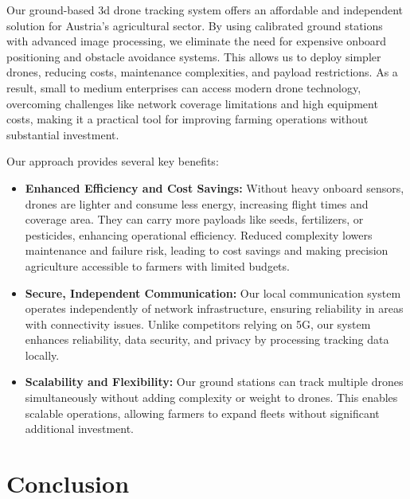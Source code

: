 Our ground-based \acrshort{3d} drone tracking system offers an affordable and independent solution for Austria's agricultural sector. By using calibrated ground stations with advanced image processing, we eliminate the need for expensive onboard positioning and obstacle avoidance systems. This allows us to deploy simpler drones, reducing costs, maintenance complexities, and payload restrictions. As a result, small to medium enterprises can access modern drone technology, overcoming challenges like network coverage limitations and high equipment costs, making it a practical tool for improving farming operations without substantial investment.

Our approach provides several key benefits:

\begin{itemize} 
	\item \textbf{Enhanced Efficiency and Cost Savings:} Without heavy onboard sensors, drones are lighter and consume less energy, increasing flight times and coverage area. They can carry more payloads like seeds, fertilizers, or pesticides, enhancing operational efficiency. Reduced complexity lowers maintenance and failure risk, leading to cost savings and making precision agriculture accessible to farmers with limited budgets.
	
	\item \textbf{Secure, Independent Communication:} Our local communication system operates independently of network infrastructure, ensuring reliability in areas with connectivity issues. Unlike competitors relying on 5G, our system enhances reliability, data security, and privacy by processing tracking data locally.
	
	\item \textbf{Scalability and Flexibility:} Our ground stations can track multiple drones simultaneously without adding complexity or weight to drones. This enables scalable operations, allowing farmers to expand fleets without significant additional investment.

\end{itemize}

\section{Conclusion}

